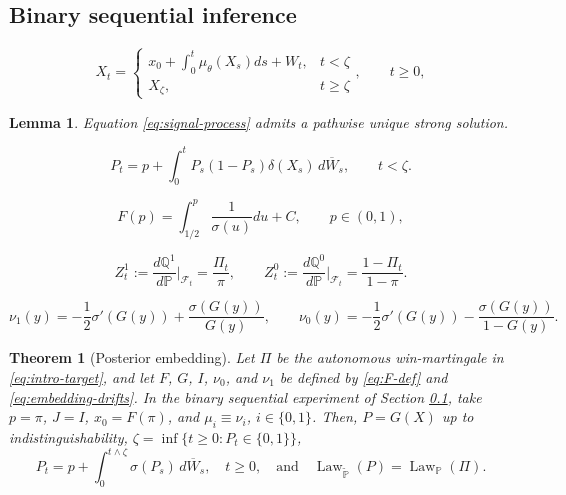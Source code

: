 \documentclass[10pt,a4paper]{amsart}
\newtheorem{lemma}{Lemma}
\newtheorem{theorem}{Theorem}
\begin{document}
\subsection{Binary sequential inference}\label{sec:bin-seq-inf}

\begin{equation}\label{eq:signal-process}
  X_t=\begin{cases}
      x_0 + \int_0^{t}\mu_\theta(X_s)ds+W_{t}, & t<\zeta\\
      X_\zeta, & t\geq \zeta
  \end{cases}, \qquad t\geq0,
\end{equation}

\begin{lemma}\label{lem:signal-well-posed}
Equation
\eqref{eq:signal-process} admits a pathwise unique strong solution.
\end{lemma}

\begin{equation}\label{eq:filtering-equation}
  P_t
  =
  p+\int_0^t
    P_s(1-P_s)\delta(X_s)\,d\overline W_s,
  \qquad t<\zeta.
\end{equation}

\begin{equation}\label{eq:F-def}
  F(p)=\int_{1/2}^p \frac{1}{\sigma(u)}du+C, \qquad p\in(0,1),
\end{equation}

\begin{equation}\label{eq:embedding-densities}
  Z_t^1
  :=
  \frac{d\mathbb Q^1}{d\mathbb P}
  \bigg|_{\mathcal F_t}
  =
  \frac{\Pi_t}{\pi},
  \qquad
  Z_t^0
  :=
  \frac{d\mathbb Q^0}{d\mathbb P}
  \bigg|_{\mathcal F_t}
  =
  \frac{1-\Pi_t}{1-\pi}.
\end{equation}

\begin{equation}\label{eq:embedding-drifts}
  \nu_1(y)=-\frac12\sigma'(G(y))+\frac{\sigma(G(y))}{G(y)},
  \qquad
  \nu_0(y)=-\frac12\sigma'(G(y))-\frac{\sigma(G(y))}{1-G(y)}.
\end{equation}

\begin{theorem}[Posterior embedding]
\label{thm:posterior-embedding}
Let $\Pi$ be the autonomous win-martingale in
\eqref{eq:intro-target}, and let $F$, $G$, $I$, $\nu_0$, and $\nu_1$
be defined by \eqref{eq:F-def} and \eqref{eq:embedding-drifts}.
In the binary sequential experiment of
Section \ref{sec:bin-seq-inf}, take $p=\pi$, $J=I$, $x_0=F(\pi)$, and $\mu_i\equiv\nu_i$, $i\in\{0,1\}$.
Then, $P=G(X)$ up to indistinguishability,
$\zeta=\inf\{t\geq0:P_t\in\{0,1\}\}$,
\begin{equation}\label{eq:thm-P-embedding}
  P_t=p+\int_0^{t\wedge \zeta}\sigma(P_s)\,d\overline W_s, \quad t\geq0, \quad \text{and} \quad \operatorname{Law}_{\widetilde{\mathbb P}}(P)=\operatorname{Law}_{\mathbb P}(\Pi).
\end{equation}
\end{theorem}
\end{document}
